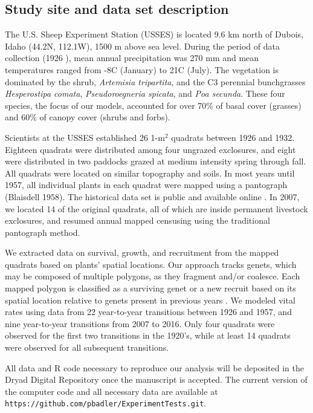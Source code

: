 \documentclass[11pt]{article}
\begin{document}
\begin{doublespacing}
\subsection*{Study site and data set description}

The U.S. Sheep Experiment Station (USSES) is located 9.6 km north of Dubois, Idaho (44.2\degree N, 112.1\degree W), 1500 m above sea level. During the period of data collection (1926 ), mean annual precipitation was 270 mm and mean temperatures ranged from -8\degree C (January) to 21\degree C (July). The vegetation is dominated by the shrub, \textit{Artemisia tripartita}, and the C3  perennial bunchgrasses \textit{Hesperostipa comata}, \textit{Pseudoroegneria spicata},  and \textit{Poa secunda}. These four species, the focus of our models, accounted for over 70\% of basal cover (grasses) and 60\% of canopy cover (shrubs and forbs). 

Scientists at the USSES established 26 1-m$^2$ quadrats between 1926 and 1932. Eighteen quadrats were distributed among four ungrazed exclosures, and eight were distributed in two paddocks grazed at medium intensity spring through fall. All quadrats were located on similar topography and soils. In most years until 1957, all individual plants in each quadrat were mapped using a pantograph (Blaisdell 1958). The historical data set is public and available online \citep{zachmann_mapped_2010}. In 2007, we located 14 of the original quadrats, all of which are inside permanent livestock exclosures, and resumed annual mapped censusing using the traditional pantograph method. 

We extracted data on survival, growth, and recruitment from the mapped quadrats based on plants' spatial locations. Our approach tracks genets, which may be composed of multiple polygons, as they fragment and/or coalesce. Each mapped polygon is classified as a surviving genet or a new recruit based on its spatial location relative to genets present in previous years \citep{lauenroth_demography_2008}. We modeled vital rates using data from 22 year-to-year transitions between 1926 and 1957, and nine year-to-year transitions from 2007 to 2016. Only four quadrats were observed for the first two transitions in the 1920's, while at least 14 quadrats were observed for all subsequent transitions. 

All data and R code necessary to reproduce our analysis will be deposited in the Dryad Digital Repository once the manuscript is accepted. The current version of the computer code and all necessary data are available at \texttt{https://github.com/pbadler/ExperimentTests.git}.


\end{doublespacing}
\end{document}
